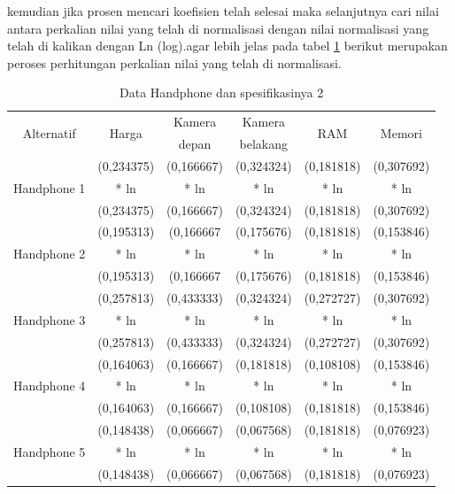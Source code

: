kemudian jika prosen mencari koefisien telah selesai maka selanjutnya cari nilai antara perkalian nilai yang telah di normalisasi dengan nilai normalisasi yang telah di kalikan dengan Ln (log).agar lebih jelas pada tabel \ref{TA5} berikut merupakan peroses perhitungan perkalian nilai yang telah di normalisasi.
\begin{table}[h]
\caption{Data Handphone dan spesifikasinya 2}
\centering
\begin{tabular}{|c|c|c|c|c|c|}
\hline
\multirow{2}{*}{Alternatif} &\multirow{2}{*}{ Harga}& Kamera & Kamera&\multirow{2}{*}{RAM}& \multirow{2}{*}{Memori}\\
& & depan & belakang & &\\
\hline
\multirow{3}{*}{Handphone 1} & (0,234375) & (0,166667)& (0,324324) &(0,181818) &(0,307692) \\
&* ln  &* ln  &* ln  &* ln  & * ln \\
&(0,234375) & (0,166667) &(0,324324) &(0,181818) &(0,307692)\\
\hline
\multirow{3}{*}{Handphone 2}&(0,195313)&(0,166667&(0,175676) &(0,181818) &(0,153846) \\
&* ln  &* ln  &* ln  &* ln  & * ln \\
&(0,195313)&(0,166667&(0,175676) &(0,181818) &(0,153846)\\
\hline
\multirow{3}{*}{Handphone 3}&(0,257813)&(0,433333) &(0,324324)&(0,272727)&(0,307692)\\
&* ln  &* ln  &* ln  &* ln  & * ln \\
&(0,257813)&(0,433333) &(0,324324)&(0,272727)&(0,307692)\\
\hline
\multirow{3}{*}{Handphone 4}&(0,164063)&(0,166667)&(0,181818)&(0,108108)&(0,153846)\\
&* ln  &* ln  &* ln  &* ln  & * ln \\
&(0,164063)&(0,166667)&(0,108108)&(0,181818)&(0,153846)\\
\hline
\multirow{3}{*}{Handphone 5}&(0,148438)&(0,066667)&(0,067568)&(0,181818)&(0,076923)\\
&* ln  &* ln  &* ln  &* ln  & * ln \\
&(0,148438)&(0,066667)&(0,067568)&(0,181818)&(0,076923)\\
\hline
\end{tabular}
\label{TA5}
\end{table}

